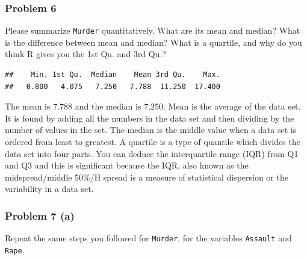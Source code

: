 \documentclass[
]{article}
\newenvironment{Shaded}{\begin{snugshade}}{\end{snugshade}}
\newcommand{\AttributeTok}[1]{\textcolor[rgb]{0.77,0.63,0.00}{#1}}
\newcommand{\FunctionTok}[1]{\textcolor[rgb]{0.00,0.00,0.00}{#1}}
\newcommand{\NormalTok}[1]{#1}
\newcommand{\SpecialCharTok}[1]{\textcolor[rgb]{0.00,0.00,0.00}{#1}}
\newcommand{\StringTok}[1]{\textcolor[rgb]{0.31,0.60,0.02}{#1}}
\begin{document}
\hypertarget{problem-6}{%
\subsubsection{Problem 6}\label{problem-6}}

Please summarize \texttt{Murder} quantitatively. What are its mean and
median? What is the difference between mean and median? What is a
quartile, and why do you think R gives you the 1st Qu. and 3rd Qu.?

\begin{Shaded}
\end{Shaded}

\begin{verbatim}
##    Min. 1st Qu.  Median    Mean 3rd Qu.    Max. 
##   0.800   4.075   7.250   7.788  11.250  17.400
\end{verbatim}

The mean is 7.788 and the median is 7.250. Mean is the average of the
data set. It is found by adding all the numbers in the data set and then
dividing by the number of values in the set. The median is the middle
value when a data set is ordered from least to greatest. A quartile is a
type of quantile which divides the data set into four parts. You can
deduce the interquartile range (IQR) from Q1 and Q3 and this is
significant because the IQR, also known as the midspread/middle 50\%/H
spread is a measure of statistical dispersion or the variability in a
data set.

\hypertarget{problem-7-a}{%
\subsubsection{Problem 7 (a)}\label{problem-7-a}}

Repeat the same steps you followed for \texttt{Murder}, for the
variables \texttt{Assault} and \texttt{Rape}.

\begin{Shaded}
\end{Shaded}
\end{document}
